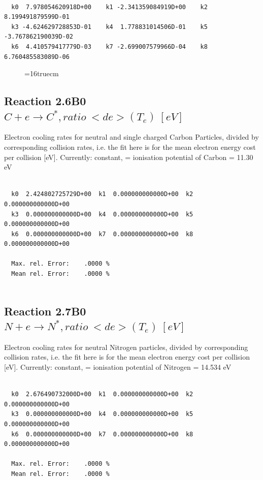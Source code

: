 \documentclass[12pt,dvips]{article}
\begin{document}
\begin{small}\begin{verbatim}

  k0  7.978054620918D+00    k1 -2.341359084919D+00    k2  8.199491879599D-01
  k3 -4.624629728853D-01    k4  1.778831014506D-01    k5 -3.767862190039D-02
  k6  4.410579417779D-03    k7 -2.699007579966D-04    k8  6.760485583089D-06

\end{verbatim}\end{small}
\begin{figure} \label{2.5ll}
\epsfxsize=16truecm
\end{figure}
\newpage

\subsection{
Reaction 2.6B0   $  C + e  \rightarrow C^*, ratio \ <de>(T_e) \ [eV] $
}

 Electron cooling rates for neutral and single
 charged Carbon Particles, divided by corresponding collision rates, i.e. the fit here is for the mean electron energy cost per collision [eV].
 Currently: constant, = ionisation potential of Carbon = 11.30 eV

\begin{small}\begin{verbatim}

  k0  2.424802725729D+00  k1  0.000000000000D+00  k2  0.000000000000D+00
  k3  0.000000000000D+00  k4  0.000000000000D+00  k5  0.000000000000D+00
  k6  0.000000000000D+00  k7  0.000000000000D+00  k8  0.000000000000D+00

  Max. rel. Error:    .0000 %
  Mean rel. Error:    .0000 %


\end{verbatim}\end{small}

\subsection{
Reaction 2.7B0   $  N + e  \rightarrow N^*, ratio \ <de>(T_e) \ [eV] $
}

 Electron cooling rates for neutral Nitrogen particles, divided by corresponding collision rates, i.e. the fit here is for the mean electron energy cost per collision [eV].
 Currently: constant, = ionisation potential of Nitrogen = 14.534 eV

\begin{small}\begin{verbatim}

  k0  2.676490732000D+00  k1  0.000000000000D+00  k2  0.000000000000D+00
  k3  0.000000000000D+00  k4  0.000000000000D+00  k5  0.000000000000D+00
  k6  0.000000000000D+00  k7  0.000000000000D+00  k8  0.000000000000D+00

  Max. rel. Error:    .0000 %
  Mean rel. Error:    .0000 %


\end{verbatim}\end{small}
\end{document}
